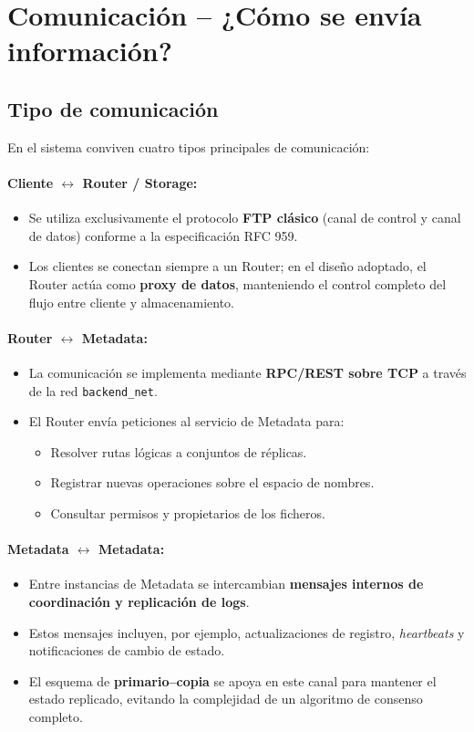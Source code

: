 \documentclass{article}
\begin{document}
\section{Comunicación – ¿Cómo se envía información?}

\subsection{Tipo de comunicación}
En el sistema conviven cuatro tipos principales de comunicación:

\paragraph{Cliente $\leftrightarrow$ Router / Storage:}
\begin{itemize}
    \item Se utiliza exclusivamente el protocolo \textbf{FTP clásico} (canal de control y canal de datos) conforme a la especificación RFC 959.
    \item Los clientes se conectan siempre a un Router; en el diseño adoptado, el Router actúa como \textbf{proxy de datos}, manteniendo el control completo del flujo entre cliente y almacenamiento.
\end{itemize}

\paragraph{Router $\leftrightarrow$ Metadata:}
\begin{itemize}
    \item La comunicación se implementa mediante \textbf{RPC/REST sobre TCP} a través de la red \texttt{backend\_net}.
    \item El Router envía peticiones al servicio de Metadata para:
    \begin{itemize}
        \item Resolver rutas lógicas a conjuntos de réplicas.
        \item Registrar nuevas operaciones sobre el espacio de nombres.
        \item Consultar permisos y propietarios de los ficheros.
    \end{itemize}
\end{itemize}

\paragraph{Metadata $\leftrightarrow$ Metadata:}
\begin{itemize}
    \item Entre instancias de Metadata se intercambian \textbf{mensajes internos de coordinación y replicación de logs}.
    \item Estos mensajes incluyen, por ejemplo, actualizaciones de registro, \emph{heartbeats} y notificaciones de cambio de estado.
    \item El esquema de \textbf{primario–copia} se apoya en este canal para mantener el estado replicado, evitando la complejidad de un algoritmo de consenso completo.
\end{itemize}
\end{document}
